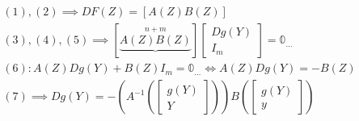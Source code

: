 \documentclass[main]{subfiles}
\begin{document}
      \begin{gather*}
         (1), (2) \implies DF(Z) = [A(Z)B(Z)] \tag{5} \\
         (3), (4), (5) \implies \left[ \underbrace{A(Z)B(Z)}^{n+m} \right] \begin{bmatrix*}
            Dg(Y) \\
            I_m
         \end{bmatrix*} = \mathbb{0}_{\ldots} \tag{6} \\
         (6): A(Z) Dg(Y) + B(Z) I_m = \mathbb{0}_{\ldots}  \Leftrightarrow
         A(Z) Dg(Y)= -B(Z) \tag{7} \\
         (7) \implies Dg(Y) = -\left(A^{-1}\left( \begin{bmatrix*}
            g(Y) \\
            Y
         \end{bmatrix*}  \right) \right) B \left( \begin{bmatrix*}
            g(Y) \\
            y
         \end{bmatrix*} \right) \tag{8} 
       \end{gather*}
\end{document}
